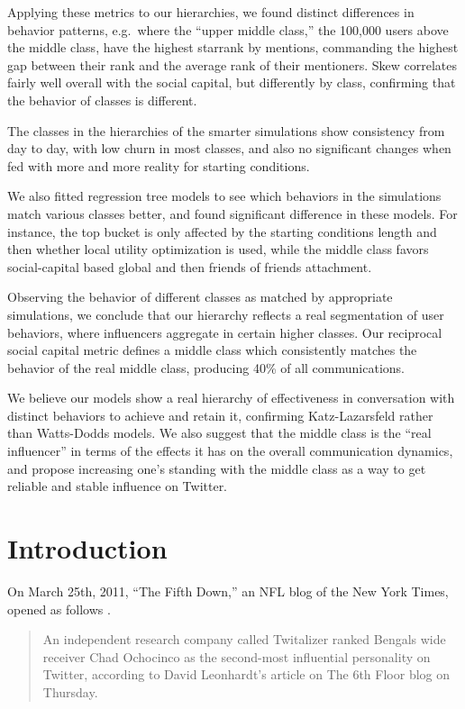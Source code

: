 \documentclass[10pt,oneside]{memoir}
\begin{document}
\begin{Spacing}{2}
Applying these metrics to our hierarchies, we found distinct differences in behavior patterns, e.g.\ where the ``upper middle class,'' the 100,000 users above the middle class, have the highest starrank by mentions, commanding the highest gap between their rank and the average rank of their mentioners.  Skew correlates fairly well overall with the social capital, but differently by class, confirming that the behavior of classes is different.


The classes in the hierarchies of the smarter simulations show consistency from day to day, with low churn in most classes, and also no significant changes when fed with more and more reality for starting conditions.  


We also fitted regression tree models to see which behaviors in the simulations match various classes better, and found significant difference in these models.  For instance, the top bucket is only affected by the starting conditions length and then whether local utility optimization is used, while the middle class favors social-capital based global and then friends of friends attachment.


Observing the behavior of different classes as matched by appropriate simulations, we conclude that our hierarchy reflects a real segmentation of user behaviors, where influencers aggregate in certain higher classes.  Our reciprocal social capital metric defines a middle class which consistently matches the behavior of the real middle class, producing 40\% of all communications.


We believe our models show a real hierarchy of effectiveness in conversation with distinct behaviors to achieve and retain it, confirming Katz-Lazarsfeld rather than Watts-Dodds models.  We also suggest that the middle class is the ``real influencer'' in terms of the effects it has on the overall communication dynamics, and propose increasing one's standing with the middle class as a way to get reliable and stable influence on Twitter.


\pagebreak \chapter{Introduction}
\label{introduction}

On March 25th, 2011, ``The Fifth Down,'' an NFL blog of the New York Times, opened as follows \cite{tanier2011ochocinco}.


\begin{quote}
An independent research company called Twitalizer ranked Bengals wide receiver Chad Ochocinco as the second-most influential personality on Twitter, according to David Leonhardt's article on The 6th Floor blog on Thursday.



\end{quote}
\end{Spacing}
\end{document}
